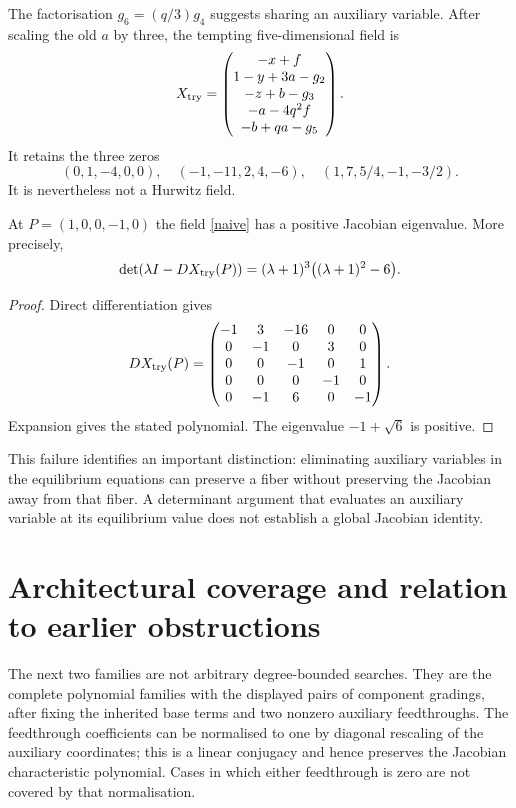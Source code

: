 \documentclass[11pt,a4paper]{article}
\theoremstyle{remark}\newtheorem{remark}[theorem]{Remark}
\begin{document}
The factorisation $g_6=(q/3)g_4$ suggests sharing an auxiliary variable. After
scaling the old $a$ by three, the tempting five-dimensional field is
\begin{equation}\label{naive}
X_{\rm try}=\begin{pmatrix}
-x+f\\1-y+3a-g_2\\-z+b-g_3\\-a-4q^2f\\-b+qa-g_5
\end{pmatrix}.
\end{equation}
It retains the three zeros
\[
(0,1,-4,0,0),\quad(-1,-11,2,4,-6),\quad
(1,7,5/4,-1,-3/2).
\]
It is nevertheless not a Hurwitz field.

\begin{proposition}\label{bad}
At $P=(1,0,0,-1,0)$ the field \eqref{naive} has a positive Jacobian eigenvalue.
More precisely,
\[
\det(\lambda I-DX_{\rm try}(P))
=(\lambda+1)^3\big((\lambda+1)^2-6\big).
\]
\end{proposition}
\begin{proof}
Direct differentiation gives
\[
DX_{\rm try}(P)=\begin{pmatrix}
-1&3&-16&0&0\\
0&-1&0&3&0\\
0&0&-1&0&1\\
0&0&0&-1&0\\
0&-1&6&0&-1
\end{pmatrix}.
\]
Expansion gives the stated polynomial. The eigenvalue $-1+\sqrt6$ is positive.
\end{proof}
This failure identifies an important distinction: eliminating auxiliary
variables in the equilibrium equations can preserve a fiber without preserving
the Jacobian away from that fiber. A determinant argument that evaluates an
auxiliary variable at its equilibrium value does not establish a global
Jacobian identity.

\section{Architectural coverage and relation to earlier obstructions}
The next two families are not arbitrary degree-bounded searches.  They are the
complete polynomial families with the displayed pairs of component gradings,
after fixing the inherited base terms and two nonzero auxiliary feedthroughs.
The feedthrough coefficients can be normalised to one by diagonal rescaling of
the auxiliary coordinates; this is a linear conjugacy and hence preserves the
Jacobian characteristic polynomial.  Cases in which either feedthrough is zero
are not covered by that normalisation.
\end{document}
